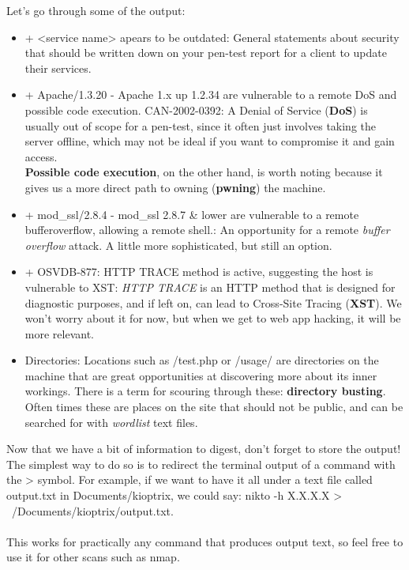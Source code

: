 \documentclass[a4paper,11pt]{article}
\renewcommand{\tt}[2][tt]{\textcolor{#1}{\ttfamily #2}}%
\begin{document}
Let's go through some of the output:
\begin{itemize}
    \item \tt{+ <service name> apears to be outdated}: General statements about security that should be written down on your pen-test report for a client to update their services.
    \item \tt{+ Apache/1.3.20 - Apache 1.x up 1.2.34 are vulnerable to a remote DoS and possible code execution. CAN-2002-0392}: A Denial of Service ({\bfseries DoS}) is usually out of scope for a pen-test, since it often just involves taking the server offline, which may not be ideal if you want to compromise it and gain access.
    \\
    {\bfseries Possible code execution}, on the other hand, is worth noting because it gives us a more direct path to owning ({\bfseries pwning}) the machine.
    \item \tt{+ mod\_ssl/2.8.4 - mod\_ssl 2.8.7 \& lower are vulnerable to a remote bufferoverflow, allowing a remote shell.}: An opportunity for a remote \textit{buffer overflow} attack. A little more sophisticated, but still an option.
    \item \tt{+ OSVDB-877: HTTP TRACE method is active, suggesting the host is vulnerable to XST}: \textit{HTTP TRACE} is an HTTP method that is designed for diagnostic purposes, and if left on, can lead to Cross-Site Tracing ({\bfseries XST}). We won't worry about it for now, but when we get to web app hacking, it will be more relevant.
    \item Directories: Locations such as \tt{/test.php} or \tt{/usage/} are directories on the machine that are great opportunities at discovering more about its inner workings. There is a term for scouring through these: {\bfseries directory busting}. Often times these are places on the site that should not be public, and can be searched for with \textit{wordlist} text files.
\end{itemize}
Now that we have a bit of information to digest, don't forget to store the output! The simplest way to do so is to redirect the terminal output of a command with the \tt{>} symbol. For example, if we want to have it all under a text file called \tt{output.txt} in \tt{Documents/kioptrix}, we could say: \tt{nikto -h X.X.X.X > ~/Documents/kioptrix/output.txt}.
\\
\\
This works for practically any command that produces output text, so feel free to use it for other scans such as \tt{nmap}.
\end{document}
